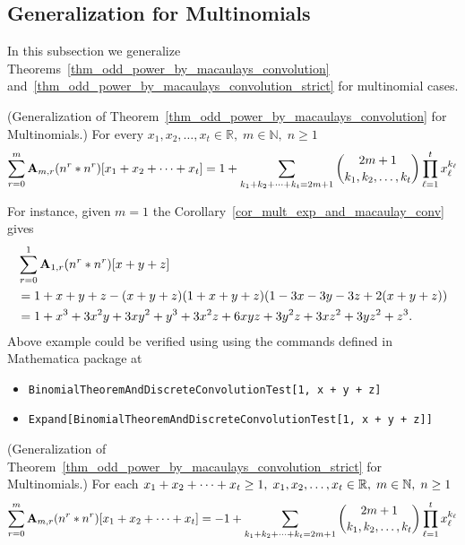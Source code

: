 \subsection{Generalization for Multinomials} \label{subsec:generalization-for-multinomials}
In this subsection we generalize
Theorems~\eqref{thm_odd_power_by_macaulays_convolution} and~\eqref{thm_odd_power_by_macaulays_convolution_strict}
for multinomial cases.
\begin{cor}
    \label{cor_mult_exp_and_macaulay_conv}
    (Generalization of Theorem~\ref{thm_odd_power_by_macaulays_convolution} for Multinomials.)
    For every $x_1, x_2, \ldots, x_t\in\mathbb{R}, \; m\in\mathbb{N}, \; n \geq 1$
    \[
        \sum_{r=0}^{m} \coeffA{m}{r} \convPower{n}{r}{\multifoldSum{t}} =
        1 + \sum_{\multifoldSum[k]{t}=2m+1} \binom{2m+1}{k_1, k_2,\ldots, k_t} \prod_{\ell=1}^{t} x_\ell^{k_\ell}
    \]
\end{cor}
For instance, given $m=1$ the Corollary~\ref{cor_mult_exp_and_macaulay_conv} gives
\begin{equation*}
    \begin{split}
        &\sum_{r=0}^{1} \coeffA{1}{r} \convPower{n}{r}{x+y+z} \\
        &=1 + x + y + z - (x + y + z) (1 + x + y + z) (1 - 3 x - 3 y - 3 z + 2 (x + y + z)) \\
        &=1 + x^3 + 3 x^2 y + 3 x y^2 + y^3 + 3 x^2 z + 6 x y z + 3 y^2 z + 3 x z^2 + 3 y z^2 + z^3.
    \end{split}
\end{equation*}
Above example could be verified using using the commands defined in Mathematica package at~\cite{github_source_files}
\begin{itemize}
    \item \texttt{BinomialTheoremAndDiscreteConvolutionTest[1, x + y + z]}
    \item \texttt{Expand[BinomialTheoremAndDiscreteConvolutionTest[1, x + y + z]]}
\end{itemize}
\begin{cor}
    \label{cor_mult_exp_and_macaulay_conv_strict}
    (Generalization of Theorem~\ref{thm_odd_power_by_macaulays_convolution_strict} for Multinomials.)
    For each $\multifoldSum{t} \geq 1, \; x_1,x_2,\ldots,x_t\in\mathbb{R}, \; m\in\mathbb{N}, \; n\geq1$
    \[
        \sum_{r=0}^{m} \coeffA{m}{r} \convPower{n}{r}{\multifoldSum{t}} =
        -1 + \sum_{\multifoldSum[k]{t}=2m+1} \binom{2m+1}{k_1, k_2,\ldots, k_t} \prod_{\ell=1}^{t} x_\ell^{k_\ell}
    \]
\end{cor}
